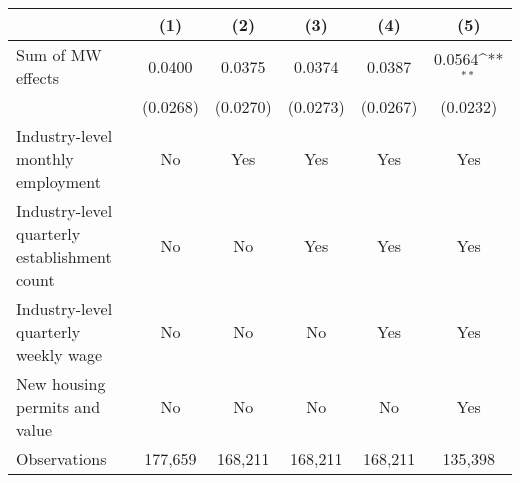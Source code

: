 {
\def\sym#1{\ifmmode^{#1}\else\(^{#1}\)\fi}
\begin{tabular}{l*{5}{c}}
\hline\hline
          &\multicolumn{1}{c}{(1)}         &\multicolumn{1}{c}{(2)}         &\multicolumn{1}{c}{(3)}         &\multicolumn{1}{c}{(4)}         &\multicolumn{1}{c}{(5)}         \\
\hline
Sum of MW effects&   0.0400         &   0.0375         &   0.0374         &   0.0387         &   0.0564\sym{**} \\
          & (0.0268)         & (0.0270)         & (0.0273)         & (0.0267)         & (0.0232)         \\
\hline
Industry-level monthly employment&       No         &      Yes         &      Yes         &      Yes         &      Yes         \\
Industry-level quarterly establishment count&       No         &       No         &      Yes         &      Yes         &      Yes         \\
Industry-level quarterly weekly wage&       No         &       No         &       No         &      Yes         &      Yes         \\
New housing permits and value&       No         &       No         &       No         &       No         &      Yes         \\
Observations&  177,659         &  168,211         &  168,211         &  168,211         &  135,398         \\
\hline\hline
\end{tabular}
}
